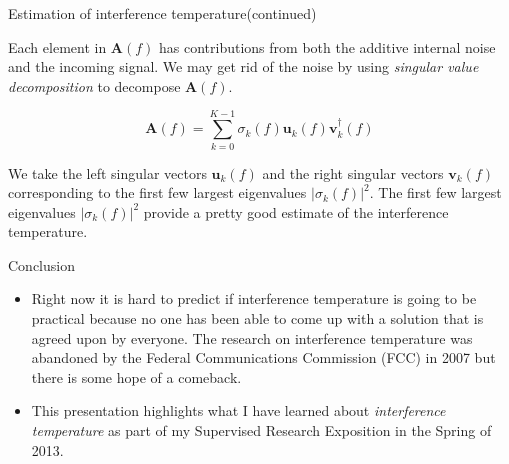 \documentclass[mathserif]{beamer}
\begin{document}
\begin{frame}{Estimation of interference temperature(continued)}

Each element in $\mathbf{A}(f)$ has contributions from both the additive internal noise and the incoming signal. We may get rid of the noise by using \emph{singular value decomposition} to decompose $\mathbf{A}(f)$.

\begin{equation}
    \mathbf{A}(f) = \sum_{k=0}^{K-1} \sigma_k(f) \mathbf{u}_k(f) \mathbf{v}_k^{\dag}(f)
\end{equation}

We take the left singular vectors $\mathbf{u}_k(f)$ and the right singular vectors $\mathbf{v}_k(f)$ corresponding to the first few largest eigenvalues $|\sigma_k(f)|^2$. The first few largest eigenvalues $|\sigma_k(f)|^2$ provide a pretty good estimate of the interference temperature.

\end{frame}

\begin{frame}{Conclusion}

\begin{itemize}
	\item Right now it is hard to predict if interference temperature is going to be practical because no one has been able to come up with a solution that is agreed upon by everyone. The research on interference temperature was abandoned by the Federal Communications Commission (FCC) in 2007 but there is some hope of a comeback.
	\item This presentation highlights what I have learned about \emph{interference temperature} as part of my Supervised Research Exposition in the Spring of 2013.

\end{itemize}
\end{frame}
\end{document}
